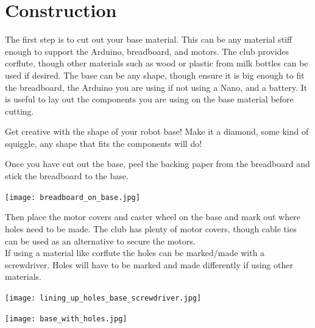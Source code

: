 \documentclass[../TinyBot.tex]{subfiles}
\begin{document}
\section{Construction} \label{sec:construction}

The first step is to cut out your base material. This can be any material stiff enough to support the Arduino, breadboard, and motors. The club provides corflute, though other materials such as wood or plastic from milk bottles can be used if desired. The base can be any shape, though ensure it is big enough to fit the breadboard, the Arduino you are using if not using a Nano, and a battery.
It is useful to lay out the components you are using on the base material before cutting. \\

\begin{notebox}
    Get creative with the shape of your robot base! Make it a diamond, some kind of squiggle, any shape that fits the components will do!    
\end{notebox}

Once you have cut out the base, peel the backing paper from the breadboard and stick the breadboard to the base.
\begin{center}
    \texttt{[image: breadboard\_on\_base.jpg]}
\end{center}

Then place the motor covers and caster wheel on the base and mark out where holes need to be made. The club has plenty of motor covers, though cable ties can be used as an alternative to secure the motors. \\
If using a material like corflute the holes can be marked/made with a screwdriver. Holes will have to be marked and made differently if using other materials. 

\begin{minipage}[t]{0.475\textwidth} \vspace{0pt}
    \begin{center}
        \texttt{[image: lining\_up\_holes\_base\_screwdriver.jpg]}
    \end{center}
\end{minipage}\hfill
\begin{minipage}[t]{0.475\textwidth} \vspace{0pt}
    \begin{center}
        \texttt{[image: base\_with\_holes.jpg]}
    \end{center}
\end{minipage}
\end{document}
